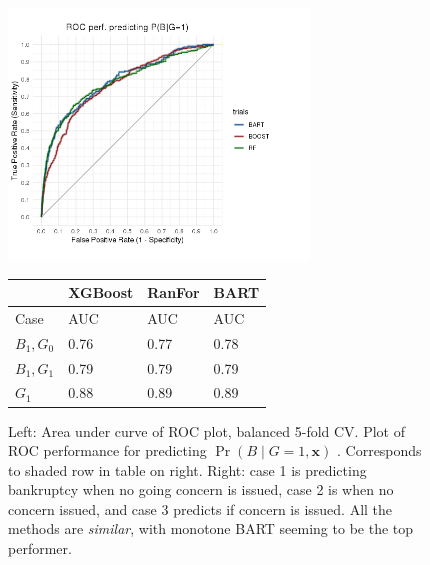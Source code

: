 \documentclass[aoas,preprint, 11pt, dvipsnames, table, x11name]{imsart}
\renewcommand{\bm}[1]{\mathbf{#1}}
\theoremstyle{remark}
\begin{document}
\begin{figure}[!httb]
	
	\begin{minipage}[t]{.5\textwidth}
		
		
		\includegraphics[width=8cm]{roc_pbg1_cv_png}
		
		
		
	\end{minipage}\hfill
	\begin{minipage}[t][-2.2cm][b]{.5\textwidth}	
		\centering
		\begin{tabular}{P{1.1cm}P{1.2cm}P{1.25cm}P{1.25cm}}
			&\color{BrickRed}\textbf{XGBoost}&\color{darkgreen}\textbf{RanFor}&\color{navy}\textbf{BART}\\ \midrule
	
			
			Case   & AUC  & AUC & AUC  \\ \midrule
			$B_1, G_0$ &0.76&0.77&0.78\\ %
			$B_1, G_1$ &0.79 &0.79&0.79 \\%
			$G_1$ &0.88&0.89&0.89 \\ \bottomrule%
		\end{tabular}
		
		
	\end{minipage}
	\caption{Left: Area under curve of ROC plot, balanced 5-fold CV.  Plot of ROC performance for predicting $\Pr(B\mid G=1, \bm{x})$ .  Corresponds to shaded row in table on right.  Right:  case 1 is predicting bankruptcy when no going concern is issued, case 2 is when no concern issued, and case 3 predicts if concern is issued.  All the methods are \emph{similar}, with monotone BART seeming to be the top performer.}
	\label{roc_plot}
\end{figure}


	
	
	
	

	
	
	
	
	
\end{document}
